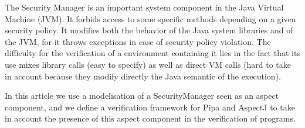 The Security Manager is an important system component in the Java
Virtual Machine (JVM).  It forbids access to some specific methods
depending on a given security policy.  It modifies both the behavior
of the Java system libraries and of the JVM, for it throws exceptions
in case of security policy violation.  The difficulty for the
verification of a environment containing it lies in the fact that its
use mixes library calls (easy to specify) as well as direct VM calls
(hard to take in account because they modify directly the Java
semantic of the execution). 

In this article we use a modelisation of a SecurityManager
seen as an aspect component, and we define a verification framework for
Pipa and AspectJ to take in account the presence of this aspect
component in the verification of programs.